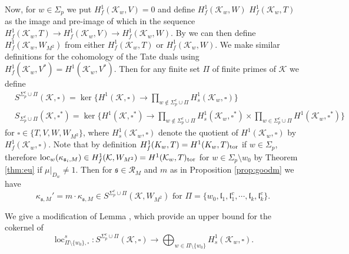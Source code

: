 \documentclass[leqno]{amsart}
\theoremstyle{definition}
\theoremstyle{remark}
\newcommand{\fl}{\mathfrak{l}}
\newcommand{\fs}{\mathfrak{s}}
\newcommand{\K}{{\mathcal{K}}} %
\DeclareMathOperator{\loc}{loc}
\begin{document}
Now, for $w\in \Sigma_p$ 
we put $H^1_f(\K_w, V)=0$
and define $H^1_f(\K_w, W)$ $H^1_f(\K_w, T)$
as the image and pre-image of which in the sequence
$H^1_f(\K_w, T)\to H^1_f(\K_w, V)\to H^1_f(\K_w, W)$.
By \cite[Lem 1.3.8]{Rubin}
we can then define $H^1_f(\K_w, W_{M^2})$
from either $H^1_f(\K_w, T)$ or $H^1_f(\K_w, W)$.
We make similar definitions for the cohomology of the Tate duals
using $H^1_f(\K_w, V^*)=H^1(\K_w, V^*)$.
Then for any finite set $\Pi$ of finite primes of $\K$ we define
\begin{align*}
    &S^{\Sigma_p^c\cup \Pi}(\K, \square)=
    \ker\big\{
    H^1(\K, \square)\to \prod_{w\notin \Sigma_p^c\cup \Pi}H^1_s(\K_w, \square)
    \big\}\\
    &S_{\Sigma_p^c\cup \Pi}(\K, \square^*)=
    \ker\big\{
    H^1(\K, \square^*)\to \prod_{w\notin \Sigma_p^c\cup \Pi}H^1_s(\K_w, \square^*)
    \times \prod_{w\in\Sigma_p^c\cup \Pi}H^1(\K_w,\square^*)
    \big\}
\end{align*}
for $\square\in \{T,V,W,W_{M^2}\}$, where $H^1_s(\K_w,\square)$
denote the quotient of $H^1(\K_w,\square)$ by $H^1_f(\K_w,\square)$.
Note that by definition $H^1_f(K_w,T)=H^1(K_w,T)_{\textnormal{tor}}$
if $w\in\Sigma_p$, 
therefore $\loc_w(\kappa_{\fs_i,M})\in H^1_f(\K, W_{M^2})=H^1(\K_w, T)_{\textnormal{tor}}$
for $w\in\Sigma_p\setminus{w_0}$
by Theorem \ref{thm:eu} if $\mu\vert_{D_w}\neq 1$.
Then for $\fs\in \mathcal{R}_M$ and $m$ as in 
Proposition \ref{prop:goodm} we have
\[
    \kappa_{\fs,M}'=m\cdot \kappa_{\fs,M}
    \in S^{\Sigma_p^c\cup \Pi}(\K, W_{M^2})
    \text{ for }\Pi=\{w_0, \fl_1,\fl_1^c,\cdots, \fl_k,\fl_k^c\}.
\]

We give a modification of Lemma \cite[Lem 5.2.5]{Rubin},
which provide an upper bound for the cokernel of
\[
    \loc_{\Pi\setminus\{w_0\},\square}^s\colon
    S^{\Sigma_p^c\cup \Pi}(\K, \square)
    \xrightarrow{}
    \bigoplus_{w\in\Pi\setminus\{w_0\}}H^1_s(\K_w, \square).
\]
\end{document}

